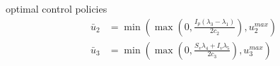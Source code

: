 \begin{frame}[plain]
\begin{textblock*}{70mm}
\begin{yellowbox}{optimal control policies}
\begin{align*}
                \bar{u}_2
                    &=
                    \min
                        \left(
                            \max
                                \left(
                                    0,\frac{I_p(\lambda_3-\lambda_1)}{2c_2}
                                \right),
                                u_2^{max}
                        \right)
                        \\
                \bar{u}_3
                    &=
                    \min
                        \left(
                            \max
                                \left(
                                    0,\frac{S_v\lambda_4+I_v\lambda_5}{2c_3}
                                \right), 
                                u^{max}_3
                        \right)
            \end{align*}
        \end{yellowbox}
    \end{textblock*}
\end{frame}
